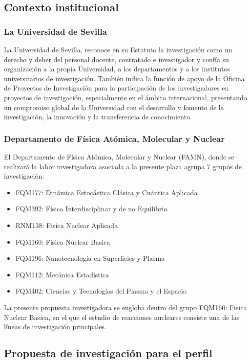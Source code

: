 \documentclass[a4paper,12pt,twoside]{article}
\begin{document}
\subsection{Contexto institucional}


\subsubsection{La Universidad de Sevilla}
La Universidad de Sevilla, reconoce en su Estatuto \cite{estatutos} la investigación como un derecho y deber del personal docente, contratado e investigador y confía su organización a la propia Universidad, a los departamentos y a los institutos universitarios de investigación. También indica la función de apoyo de la Oficina de Proyectos de Investigación para la participación de los investigadores en proyectos de investigación, especialmente en el ámbito internacional, presentando un compromiso global de la Universidad con el desarrollo y fomento de la investigación, la innovación y la transferencia de conocimiento.

\subsubsection{Departamento de Física Atómica, Molecular y Nuclear}

El Departamento de Física Atómica, Molecular y Nuclear (FAMN), donde se realizará la labor investigadora asociada a la presente plaza agrupa 7 grupos de investigación:

\begin{itemize}
\item FQM177: Dinámica Estocástica Clásica y Cuántica Aplicada
\item FQM392: Física Interdisciplinar y de no Equilibrio
\item RNM138: Fisica Nuclear Aplicada
\item FQM160: Fisica Nuclear Basica
\item FQM196: Nanotecnología en Superficies y Plasma
\item FQM112: Mecánica Estadística
\item FQM402: Ciencias y Tecnologías del Plasma y el Espacio
\end{itemize}

La presente propuesta investigadora se engloba dentro del grupo FQM160: Fisica Nuclear Basica, en el que el estudio de reacciones nucleares consiste una de las líneas de investigación principales.

\subsection{Propuesta de investigación para el perfil}
\end{document}
